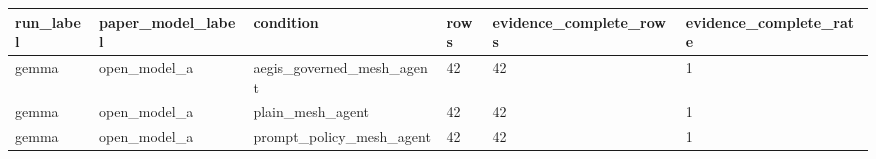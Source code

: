 \begin{tabular}{llllll}
 \hline
run\_label & paper\_model\_label & condition & rows & evidence\_complete\_rows & evidence\_complete\_rate \\
 \hline
gemma & open\_model\_a & aegis\_governed\_mesh\_agent & 42 & 42 & 1 \\
gemma & open\_model\_a & plain\_mesh\_agent & 42 & 42 & 1 \\
gemma & open\_model\_a & prompt\_policy\_mesh\_agent & 42 & 42 & 1 \\
 \hline
\end{tabular}
